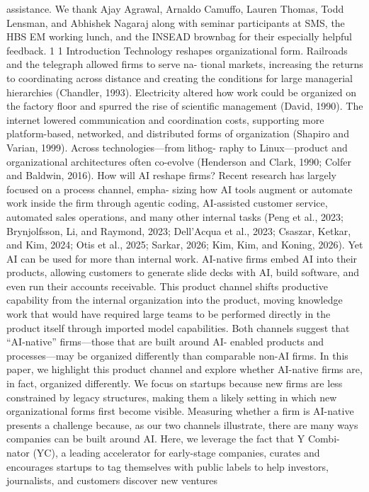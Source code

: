 assistance. We thank Ajay Agrawal, Arnaldo Camuffo, Lauren Thomas, Todd Lensman, and Abhishek Nagaraj along
with seminar participants at SMS, the HBS EM working lunch, and the INSEAD brownbag for their especially helpful
feedback.
1
1
Introduction
Technology reshapes organizational form. Railroads and the telegraph allowed firms to serve na-
tional markets, increasing the returns to coordinating across distance and creating the conditions
for large managerial hierarchies (Chandler, 1993). Electricity altered how work could be organized
on the factory floor and spurred the rise of scientific management (David, 1990).
The internet
lowered communication and coordination costs, supporting more platform-based, networked, and
distributed forms of organization (Shapiro and Varian, 1999). Across technologies—from lithog-
raphy to Linux—product and organizational architectures often co-evolve (Henderson and Clark,
1990; Colfer and Baldwin, 2016).
How will AI reshape firms? Recent research has largely focused on a process channel, empha-
sizing how AI tools augment or automate work inside the firm through agentic coding, AI-assisted
customer service, automated sales operations, and many other internal tasks (Peng et al., 2023;
Brynjolfsson, Li, and Raymond, 2023; Dell’Acqua et al., 2023; Csaszar, Ketkar, and Kim, 2024;
Otis et al., 2025; Sarkar, 2026; Kim, Kim, and Koning, 2026). Yet AI can be used for more than
internal work. AI-native firms embed AI into their products, allowing customers to generate slide
decks with AI, build software, and even run their accounts receivable. This product channel shifts
productive capability from the internal organization into the product, moving knowledge work that
would have required large teams to be performed directly in the product itself through imported
model capabilities. Both channels suggest that “AI-native” firms—those that are built around AI-
enabled products and processes—may be organized differently than comparable non-AI firms.
In this paper, we highlight this product channel and explore whether AI-native firms are, in
fact, organized differently. We focus on startups because new firms are less constrained by legacy
structures, making them a likely setting in which new organizational forms first become visible.
Measuring whether a firm is AI-native presents a challenge because, as our two channels illustrate,
there are many ways companies can be built around AI. Here, we leverage the fact that Y Combi-
nator (YC), a leading accelerator for early-stage companies, curates and encourages startups to tag
themselves with public labels to help investors, journalists, and customers discover new ventures
